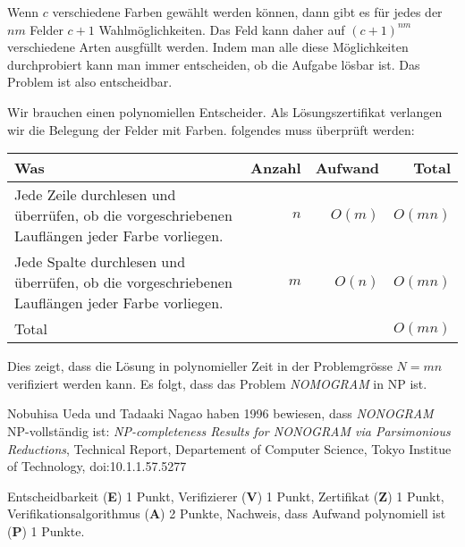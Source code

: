 \begin{loesung}
\begin{teilaufgaben}
\item
Wenn $c$ verschiedene Farben gewählt werden können, dann gibt es für
jedes der $nm$ Felder $c+1$ Wahlmöglichkeiten. 
Das Feld kann daher auf $(c+1)^{nm}$ verschiedene Arten ausgfüllt
werden.
Indem man alle diese Möglichkeiten durchprobiert kann man immer entscheiden,
ob die Aufgabe lösbar ist.
Das Problem ist also entscheidbar.
\item
Wir brauchen einen polynomiellen Entscheider.
Als Lösungszertifikat verlangen wir die Belegung der Felder mit Farben.
folgendes muss überprüft werden:
\begin{center}
\begin{tabular}{lrrr}
Was&Anzahl&Aufwand&Total\\
\hline
\begin{minipage}[t]{0.6\hsize}
\strut
Jede Zeile durchlesen und überrüfen, ob die vorgeschriebenen Lauflängen
jeder Farbe vorliegen.\strut
\end{minipage}&$n$&$O(m)$&$O(mn)$\\
\begin{minipage}[t]{0.6\hsize}
\strut
Jede Spalte durchlesen und überrüfen, ob die vorgeschriebenen Lauflängen
jeder Farbe vorliegen.\strut
\end{minipage}&$m$&$O(n)$&$O(mn)$\\
\hline
\strut
Total&&&$O(mn)$
\end{tabular}
\end{center}
Dies zeigt, dass die Lösung in polynomieller Zeit in der Problemgrösse
$N=mn$ verifiziert werden kann. 
Es folgt, dass das Problem
{\em NOMOGRAM} in NP ist.
\qedhere
\end{teilaufgaben}
\end{loesung}

\begin{diskussion}
Nobuhisa Ueda und Tadaaki Nagao haben 1996 bewiesen, dass
{\em NONOGRAM} NP-vollständig ist:
{\em NP-completeness Results for NONOGRAM via Parsimonious Reductions},
Technical Report,
Departement of Computer Science,
Tokyo Institue of Technology, doi:10.1.1.57.5277
\end{diskussion}

\begin{bewertung}
Entscheidbarkeit ({\bf E}) 1 Punkt,
Verifizierer ({\bf V}) 1 Punkt,
Zertifikat ({\bf Z}) 1 Punkt,
Verifikationsalgorithmus ({\bf A}) 2 Punkte,
Nachweis, dass Aufwand polynomiell ist ({\bf P}) 1 Punkte.
\end{bewertung}

